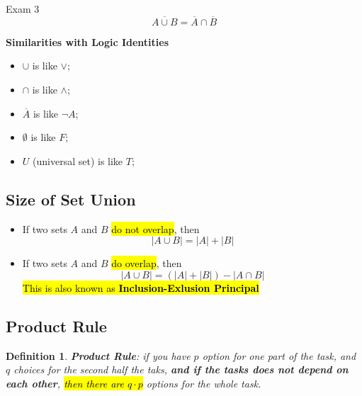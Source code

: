 \documentclass{note}
\newcommand{\intersect}{\cap}
\newcommand{\union}{\cup}
\newtheorem{definition}{Definition}
\begin{document}
\begin{note}{Exam 3}
        \begin{displaymath}
            \overline{A \union B} = \overline{A} \intersect \overline{B}
        \end{displaymath}

        \textbf{Similarities with Logic Identities}
        \begin{itemize}
            \item $ \union $ is like $ \vee $;
            \item $ \intersect $ is like $ \wedge $;
            \item $ \overline{A} $ is like $ \neg A $;
            \item $ \emptyset $ is like $ F $;
            \item $ U $ (universal set) is like $ T $;
        \end{itemize}

        \subsection{Size of Set Union}

        \begin{itemize}
            \item If two sets $ A $ and $ B $ \hl{do not overlap}, then
            \begin{equation}\label{eq: size of union - no overlap}
                \left| A \union B \right| = \left| A \right| + \left| B \right|
            \end{equation}

            \item If two sets $ A $ and $ B $ \hl{do overlap}, then
            \begin{equation}\label{eq: size of union - overlap}
                \left| A \union B \right| = \left( \left| A \right| + \left| B \right| \right) - \left| A \intersect B  \right|
            \end{equation}
            \hl{This is also known as \textbf{Inclusion-Exlusion Principal}}
        \end{itemize}

        \subsection{Product Rule}

        \begin{definition}
            \textbf{Product Rule}: if you have $ p $ option for one part of the task, and $ q $ choices for the second half
            the taks, \textbf{and if the tasks does not depend on each other}, \hl{then there are $ q \cdot p $} options
            for the whole task.
        \end{definition}


\end{note}
\end{document}
